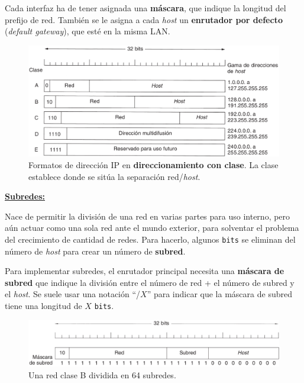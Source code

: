 \documentclass[10pt,a4paper]{article}
\begin{document}
Cada interfaz ha de tener asignada una \textbf{máscara}, que indique la longitud del prefijo de red. También se le asigna a cada \textit{host} un \textbf{enrutador por defecto} (\textit{default gateway}), que esté en la misma LAN.

\begin{figure}[ht!]
  \caption{Formatos de dirección IP en \textbf{direccionamiento con clase}. La clase establece donde se sitúa la separación red/\textit{host}.}
  \label{fig:clases_IP}
  \centerline{\includegraphics[width=\textwidth-\fboxrule-\fboxrule]{imgs/clases_IP.png}}
\end{figure}

\underline{\textbf{Subredes:}}

Nace de permitir la división de una red en varias partes para uso interno, pero aún actuar como una sola red ante el mundo exterior, para solventar el problema del crecimiento de cantidad de redes. Para hacerlo, algunos \texttt{bits} se eliminan del número de \textit{host} para crear un número de \textbf{subred}.

Para implementar subredes, el enrutador principal necesita una \textbf{máscara de subred} que indique la división entre el número de red + el número de subred y el \textit{host}. Se suele usar una notación ``/$X$'' para indicar que la máscara de subred tiene una longitud de $X$ \texttt{bits}.

\begin{figure}[ht!]
  \caption{Una red clase B dividida en 64 subredes.}
  \label{fig:subred_claseB}
  \centerline{\includegraphics[width=\textwidth-\fboxrule-\fboxrule]{imgs/subred_claseB.png}}
\end{figure}
\end{document}
